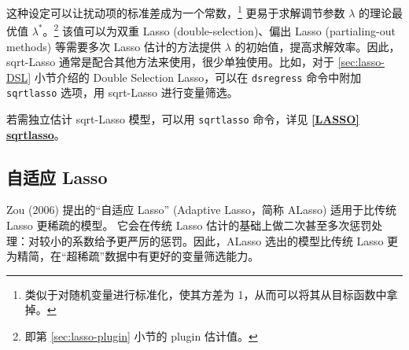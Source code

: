 这种设定可以让扰动项的标准差成为一个常数，\footnote{%
  类似于对随机变量进行标准化，使其方差为 1，从而可以将其从目标函数中拿掉。}
更易于求解调节参数 $\lambda$ 的理论最优值 $\lambda^*$。\footnote{%
      即第 \ref{sec:lasso-plugin} 小节的 plugin 估计值。}
该值可以为双重 Lasso (double-selection)、偏出 Lasso (partialing-out methods) 等需要多次 Lasso 估计的方法提供 $\lambda$ 的初始值，提高求解效率。因此，sqrt-Lasso 通常是配合其他方法来使用，很少单独使用。比如，对于 \ref{sec:lasso-DSL} 小节介绍的 Double Selection Lasso，可以在 \texttt{dsregress} 命令中附加 \texttt{sqrtlasso} 选项，用 sqrt-Lasso 进行变量筛选。

若需独立估计 sqrt-Lasso 模型，可以用 \texttt{sqrtlasso} 命令，详见 \href{https://www.stata.com/manuals/lassosqrtlasso.pdf}{\bfseries{[\MakeUppercase{lasso}] sqrtlasso}}。


%






\subsection{自适应 Lasso}\label{sec:adaptive-lasso}

Zou (2006) 提出的“自适应 Lasso” (Adaptive Lasso，简称 ALasso) 适用于比传统 Lasso 更稀疏的模型。%
它会在传统 Lasso 估计的基础上做二次甚至多次惩罚处理：对较小的系数给予更严厉的惩罚。因此，ALasso 选出的模型比传统 Lasso 更为精简，在“超稀疏”数据中有更好的变量筛选能力。

